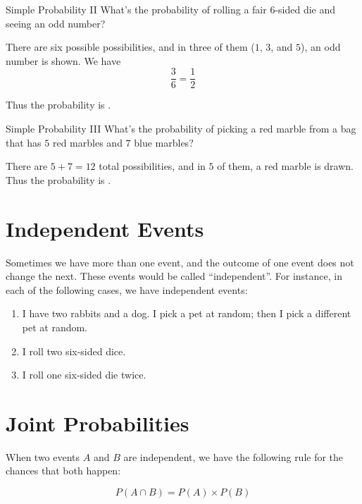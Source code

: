 \documentclass[a4paper,10pt]{report}
\begin{document}
\begin{problem}{Simple Probability II}
 What's the probability of rolling a fair $6$-sided die and seeing an odd
 number?

 \begin{solution}
  There are six possible possibilities, and in three of them ($1$, $3$, and
  $5$), an odd number is shown. We have \[
   \frac{3}{6} = \frac{1}{2}
  \]

  Thus the probability is .
 \end{solution}
\end{problem}

\begin{problem}{Simple Probability III}
 What's the probability of picking a red marble from a bag that has $5$ red
 marbles and $7$ blue marbles?

 \begin{solution}
  There are $5+7=12$ total possibilities, and in $5$ of them, a red marble is
  drawn. Thus the probability is .
 \end{solution}
\end{problem}

\section{Independent Events}

Sometimes we have more than one event, and the outcome of one event does not
change the next. These events would be called ``independent''. For instance,
in each of the following cases, we have independent events:

\begin{enumerate}
 \item I have two rabbits and a dog. I pick a pet at random; then I pick a
 different pet at random.
 \item I roll two six-sided dice.
 \item I roll one six-sided die twice.
\end{enumerate}

\section{Joint Probabilities}

When two events $A$ and $B$ are independent, we have the following rule for the
chances that both happen:

\begin{equation}
 P(A \cap B) = P(A) \times P(B)
\end{equation}
\end{document}
